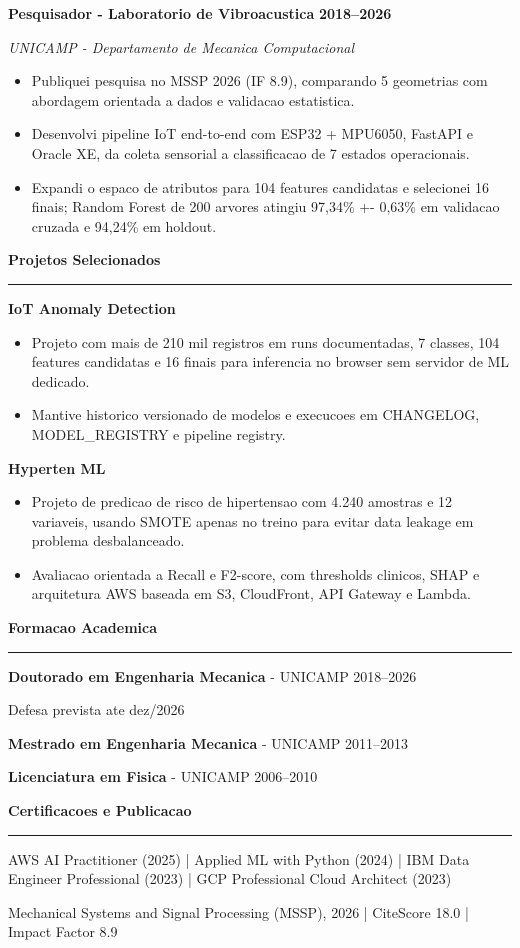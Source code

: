 \documentclass[10pt,a4paper]{article}
\newcommand{\cvsection}[1]{%
    \vspace{0.4em}
    {\large\bfseries #1}\par
    \vspace{0.08em}
    \hrule
    \vspace{0.18em}
}
\newcommand{\jobentry}[4]{%
    \textbf{#1} \hfill \textbf{#2}\par
    \textit{#3}\par
    #4
    \vspace{0.15em}
}
\begin{document}
\jobentry{Pesquisador - Laboratorio de Vibroacustica}{2018--2026}{UNICAMP - Departamento de Mecanica Computacional}{
\begin{itemize}
    \item Publiquei pesquisa no MSSP 2026 (IF 8.9), comparando 5 geometrias com abordagem orientada a dados e validacao estatistica.
    \item Desenvolvi pipeline IoT end-to-end com ESP32 + MPU6050, FastAPI e Oracle XE, da coleta sensorial a classificacao de 7 estados operacionais.
    \item Expandi o espaco de atributos para 104 features candidatas e selecionei 16 finais; Random Forest de 200 arvores atingiu 97,34\% +- 0,63\% em validacao cruzada e 94,24\% em holdout.
\end{itemize}
}

\cvsection{Projetos Selecionados}
\textbf{IoT Anomaly Detection}\par
\begin{itemize}
    \item Projeto com mais de 210 mil registros em runs documentadas, 7 classes, 104 features candidatas e 16 finais para inferencia no browser sem servidor de ML dedicado.
    \item Mantive historico versionado de modelos e execucoes em CHANGELOG, MODEL\_REGISTRY e pipeline registry.
\end{itemize}

\textbf{Hyperten ML}\par
\begin{itemize}
    \item Projeto de predicao de risco de hipertensao com 4.240 amostras e 12 variaveis, usando SMOTE apenas no treino para evitar data leakage em problema desbalanceado.
    \item Avaliacao orientada a Recall e F2-score, com thresholds clinicos, SHAP e arquitetura AWS baseada em S3, CloudFront, API Gateway e Lambda.
\end{itemize}

\cvsection{Formacao Academica}
\textbf{Doutorado em Engenharia Mecanica} - UNICAMP \hfill 2018--2026\par
Defesa prevista ate dez/2026\par
\textbf{Mestrado em Engenharia Mecanica} - UNICAMP \hfill 2011--2013\par
\textbf{Licenciatura em Fisica} - UNICAMP \hfill 2006--2010

\cvsection{Certificacoes e Publicacao}
AWS AI Practitioner (2025) | Applied ML with Python (2024) | IBM Data Engineer Professional (2023) | GCP Professional Cloud Architect (2023)\par
Mechanical Systems and Signal Processing (MSSP), 2026 | CiteScore 18.0 | Impact Factor 8.9
\end{document}
